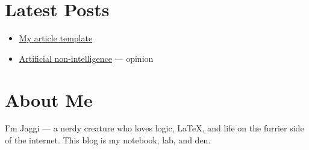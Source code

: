 \documentclass{article}
\begin{document}
\section*{Latest Posts}

\begin{itemize}
  \item \href{posts/article-template.html}{My article template}
  \item
    \href{output/posts/artificial-non-inteligence/artificial-non-intelligence.html}{Artificial
    non-intelligence} --- opinion
\end{itemize}

\section*{About Me}

I'm Jaggi — a nerdy creature who loves logic, LaTeX, and life on the
furrier side of the internet. This blog is my notebook, lab, and den.
\end{document}
